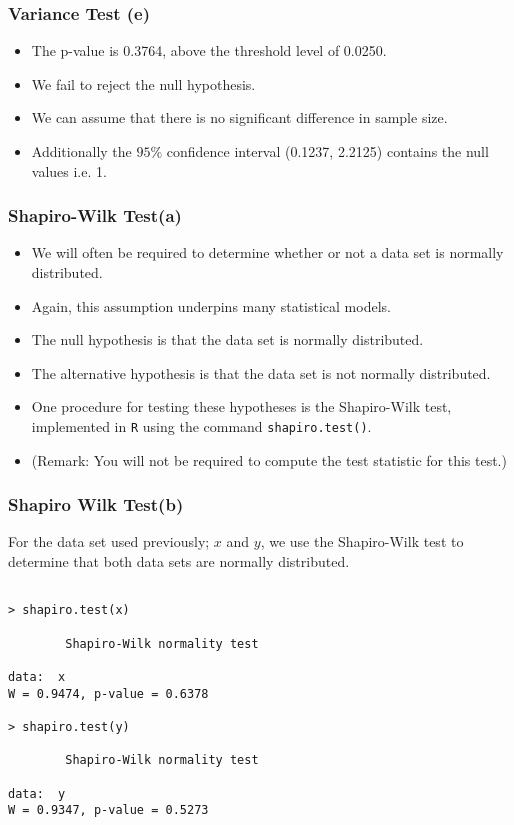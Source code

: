 \documentclass[a4]{beamer}
\begin{document}
\begin{frame}
\frametitle{Variance Test (e)}
\begin{itemize}
\item The p-value is 0.3764, above the threshold level of 0.0250.
\item We fail to reject the null hypothesis.
\item We can assume that there is no significant difference in sample size.
\item Additionally the $95\%$ confidence interval (0.1237, 2.2125) contains the null values i.e. 1.
\end{itemize}
\end{frame}




\begin{frame}
\frametitle{Shapiro-Wilk Test(a)}


\begin{itemize}
\item We will often be required to determine whether or not a data set is normally distributed.
\item Again, this assumption underpins many statistical models.
\item The null hypothesis is that the data set is normally distributed.
\item The alternative hypothesis is that the data set is not normally distributed.
\item One procedure for testing these hypotheses is the Shapiro-Wilk test, implemented in \texttt{R} using the command \texttt{shapiro.test()}.
\item (Remark: You will not be required to compute the test statistic for this test.)
\end{itemize}
\end{frame}
\begin{frame}[fragile]
\frametitle{Shapiro Wilk Test(b)}
For the data set used previously; $x$ and $y$, we use the Shapiro-Wilk test to determine that both data sets are normally distributed.
\begin{verbatim}

> shapiro.test(x)

        Shapiro-Wilk normality test

data:  x
W = 0.9474, p-value = 0.6378

> shapiro.test(y)

        Shapiro-Wilk normality test

data:  y
W = 0.9347, p-value = 0.5273
\end{verbatim}

\end{frame}
\end{document}
